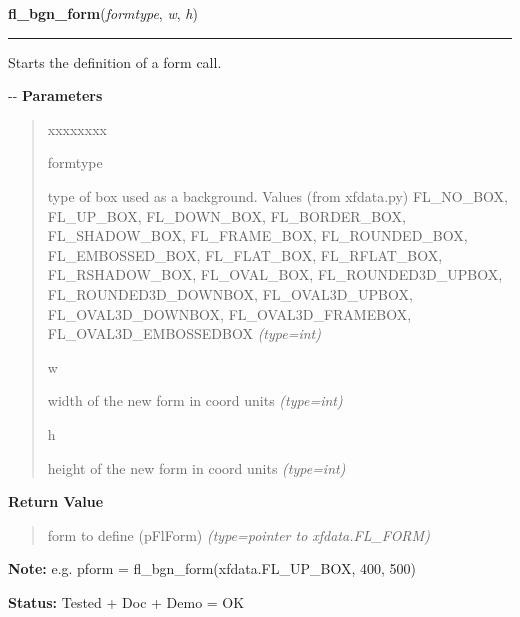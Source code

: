 \hspace{.8\funcindent}\begin{boxedminipage}{\funcwidth}

    \raggedright \textbf{fl\_bgn\_form}(\textit{formtype}, \textit{w}, \textit{h})

    \vspace{-1.5ex}

    \rule{\textwidth}{0.5\fboxrule}
\setlength{\parskip}{2ex}

Starts the definition of a form call.

-{}-
\setlength{\parskip}{1ex}
      \textbf{Parameters}
      \vspace{-1ex}

      \begin{quote}
        \begin{Ventry}{xxxxxxxx}

          \item[formtype]


type of box used as a background. Values (from xfdata.py) FL\_NO\_BOX,
FL\_UP\_BOX, FL\_DOWN\_BOX, FL\_BORDER\_BOX, FL\_SHADOW\_BOX, FL\_FRAME\_BOX,
FL\_ROUNDED\_BOX, FL\_EMBOSSED\_BOX, FL\_FLAT\_BOX, FL\_RFLAT\_BOX,
FL\_RSHADOW\_BOX, FL\_OVAL\_BOX, FL\_ROUNDED3D\_UPBOX, FL\_ROUNDED3D\_DOWNBOX,
FL\_OVAL3D\_UPBOX, FL\_OVAL3D\_DOWNBOX, FL\_OVAL3D\_FRAMEBOX,
FL\_OVAL3D\_EMBOSSEDBOX
            {\it (type=int)}

          \item[w]


width of the new form in coord units
            {\it (type=int)}

          \item[h]


height of the new form in coord units
            {\it (type=int)}

        \end{Ventry}

      \end{quote}

      \textbf{Return Value}
    \vspace{-1ex}

      \begin{quote}

form to define (pFlForm)
      {\it (type=pointer to xfdata.FL\_FORM)}

      \end{quote}

\textbf{Note:} 
e.g. pform = fl\_bgn\_form(xfdata.FL\_UP\_BOX, 400, 500)


\textbf{Status:} 
Tested + Doc + Demo = OK


    \end{boxedminipage}

